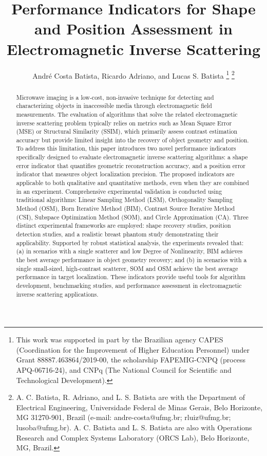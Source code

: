 \documentclass{IEEEtran}
\begin{document}
    \title{Performance Indicators for Shape and Position Assessment in Electromagnetic Inverse Scattering}
    \author{Andr\'e Costa Batista, Ricardo Adriano, and Lucas S. Batista
    \thanks{This work was supported in part by the Brazilian agency CAPES (Coordination for the Improvement of Higher Education Personnel) under Grant 88887.463864/2019-00, the scholarship FAPEMIG-CNPQ (process APQ-06716-24), and CNPq (The National Council for Scientific and Technological Development).}
    \thanks{A. C. Batista, R. Adriano, and L. S. Batista are with the Department of Electrical Engineering, Universidade Federal de Minas Gerais, Belo Horizonte, MG 31270-901, Brazil (e-mail: andre-costa@ufmg.br; rluiz@ufmg.br; lusoba@ufmg.br). A. C. Batista and L. S. Batista are also with Operations Research and Complex Systems Laboratory (ORCS Lab), Belo Horizonte, MG, Brazil.}}
   
    \maketitle
    
    \begin{abstract}
        Microwave imaging is a low-cost, non-invasive technique for detecting and characterizing objects in inaccessible media through electromagnetic field measurements. The evaluation of algorithms that solve the related electromagnetic inverse scattering problem typically relies on metrics such as Mean Square Error (MSE) or Structural Similarity (SSIM), which primarily assess contrast estimation accuracy but provide limited insight into the recovery of object geometry and position. To address this limitation, this paper introduces two novel performance indicators specifically designed to evaluate electromagnetic inverse scattering algorithms: a shape error indicator that quantifies geometric reconstruction accuracy, and a position error indicator that measures object localization precision. The proposed indicators are applicable to both qualitative and quantitative methods, even when they are combined in an experiment. Comprehensive experimental validation is conducted using traditional algorithms: Linear Sampling Method (LSM), Orthogonality Sampling Method (OSM), Born Iterative Method (BIM), Contrast Source Iterative Method (CSI), Subspace Optimization Method (SOM), and Circle Approximation (CA). Three distinct experimental frameworks are employed: shape recovery studies, position detection studies, and a realistic breast phantom study demonstrating their applicability. Supported by robust statistical analysis, the experiments revealed that: (a) in scenarios with a single scatterer and low Degree of Nonlinearity, BIM achieves the best average performance in object geometry recovery; and (b) in scenarios with a single small-sized, high-contrast scatterer, SOM and OSM achieve the best average performance in target localization. These indicators provide useful tools for algorithm development, benchmarking studies, and performance assessment in electromagnetic inverse scattering applications.
        
    \end{abstract}
    
\end{document}
